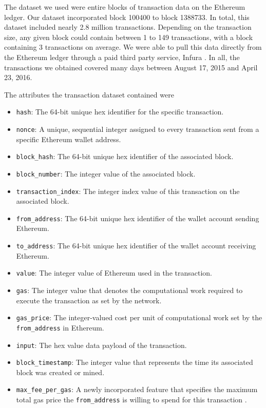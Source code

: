 \documentclass[sigconf]{acmart}
\begin{document}
The dataset we used were entire blocks of transaction data on the Ethereum ledger. Our dataset incorporated block 100400 to block 1388733. In total, this dataset included nearly 2.8 million transactions. Depending on the transaction size, any given block could contain between 1 to 149 transactions, with a block containing 3 transactions on average. We were able to pull this data directly from the Ethereum ledger through a paid third party service, Infura \cite{InfuraURL}. In all, the transactions we obtained covered many days between August 17, 2015 and April 23, 2016. 

The attributes the transaction dataset contained were 
\begin{itemize}
    \item \texttt{hash}: The 64-bit unique hex identifier for the specific transaction.
    \item \texttt{nonce}: A unique, sequential integer assigned to every transaction sent from a specific Ethereum wallet address.
    \item \texttt{block\_hash}: The 64-bit unique hex identifier of the associated block.
    \item \texttt{block\_number}: The integer value of the associated block.
    \item \texttt{transaction\_index}: The integer index value of this transaction on the associated block.
    \item \texttt{from\_address}: The 64-bit unique hex identifier of the wallet account sending Ethereum.
    \item \texttt{to\_address}: The 64-bit unique hex identifier of the wallet account receiving Ethereum.
    \item \texttt{value}: The integer value of Ethereum used in the transaction.
    \item \texttt{gas}: The integer value that denotes the computational work required to execute the transaction as set by the network.
    \item \texttt{gas\_price}: The integer-valued cost per unit of computational work set by the \texttt{from\_address} in Ethereum.
    \item \texttt{input}: The hex value data payload of the transaction.
    \item \texttt{block\_timestamp}: The integer value that represents the time its associated block was created or mined.
    \item \texttt{max\_fee\_per\_gas}: A newly incorporated feature that specifies the maximum total gas price the \texttt{from\_address} is willing to spend for this transaction \citep{LondonHardfork}.

\end{itemize}
\end{document}

